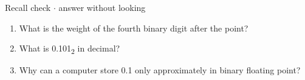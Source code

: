 \documentclass[11pt]{article}
\begin{document}
\begin{keepsection}
\begin{keepsection}
\begin{recallbox}{Recall check \ensuremath{\cdot} answer without looking}
\begin{enumerate}
\item What is the weight of the fourth binary digit after the point?
\item What is 0.101\textsubscript{2} in decimal?
\item Why can a computer store 0.1 only approximately in binary floating point?
\end{enumerate}

\end{recallbox}
\end{keepsection}
\end{keepsection}
\end{document}
